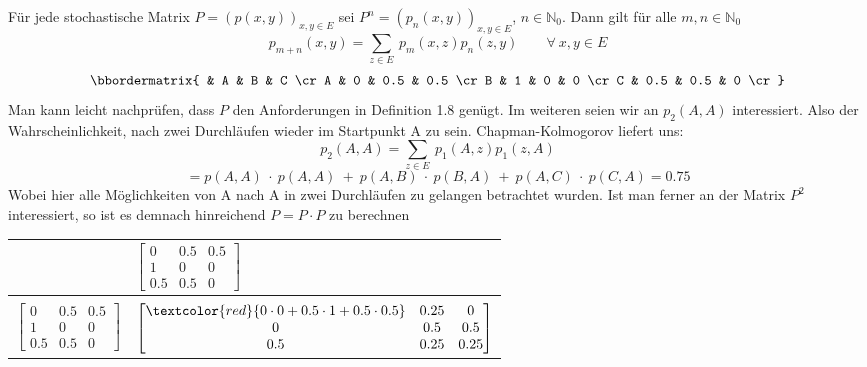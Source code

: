 \label{Chapman-Kolmogorov Gleichung}
Für jede stochastische Matrix $P =(p(x,y))_{x,y \in E}$  sei $P^{n} =(p_{n}(x,y))_{x,y \in E}$, $n \in \mathbb{N}_{0}$. Dann gilt für alle $m,n \in \mathbb{N}_{0}$
\begin{equation*}
p_{m+n} (x,y) = \sum_{z \in E} \: p_{m}(x,z) p_{n}(z,y) \qquad \forall \: x,y \in E
\end{equation*}
\begin{equation*}
\bbordermatrix{
  & A   & B   & C  \cr
A & 0 & 0.5 & 0.5 \cr
B & 1 & 0 & 0 \cr
C & 0.5 & 0.5 & 0  \cr
}
\end{equation*}
\newline
\newline
Man kann leicht nachprüfen, dass $P$ den Anforderungen in Definition 1.8 genügt. Im weiteren seien wir an $p_{2}(A,A)$ interessiert. Also der Wahrscheinlichkeit, nach zwei Durchläufen wieder im Startpunkt A zu sein. Chapman-Kolmogorov liefert uns:  
\begin{equation*}
p_{2} (A,A) = \sum_{z \in E} \: p_{1}(A,z) p_{1}(z,A) 
\end{equation*}
\begin{equation*}
= p(A,A) \: \cdot \: p(A,A) \: + \: p(A,B) \: \cdot \: p(B,A) \: + \: p(A,C) \: \cdot \: p(C,A) = 0.75
\end{equation*}
Wobei hier alle Möglichkeiten von A nach A in zwei Durchläufen zu gelangen betrachtet wurden. Ist man ferner an der Matrix $P^{2}$ interessiert, so ist es demnach hinreichend $P = P \cdot P$ zu berechnen
\begin{table}[H]
  \centering
  \begin{tabular}{c|l}
       &  $ \begin{bmatrix} 0 & 0.5 & 0.5 \\ 1 & 0 & 0 \\ 0.5 & 0.5 & 0 \end{bmatrix} $ \\[7mm]
      \hline \\ [-3mm]
    $ \begin{bmatrix} 0 & 0.5 & 0.5 \\ 1 & 0 & 0 \\ 0.5 & 0.5 & 0 \end{bmatrix} $ &
    $ \begin{bmatrix} \textcolor{red} {0 \cdot 0 + 0.5 \cdot 1 + 0.5 \cdot 0.5 }& 0.25 & 0\\ 
                 0 & 0.5 & 0.5 \\ 
                  0.5 & 0.25 & 0.25    \end{bmatrix} $
  \end{tabular}
\end{table}